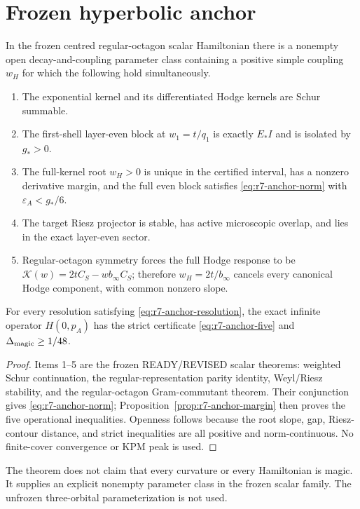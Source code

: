 \section{Frozen hyperbolic anchor}
\label{sec:r7-anchor}

\begin{theorem}
\label{thm:r7-anchor}
In the frozen centred regular-octagon scalar Hamiltonian there is a nonempty
open decay-and-coupling parameter class containing a positive simple coupling
$w_H$ for which the following hold simultaneously.
\begin{enumerate}
\item The exponential kernel and its differentiated Hodge kernels are Schur
summable.
\item The first-shell layer-even block at $w_1=t/q_1$ is exactly $E_*I$ and
is isolated by $g_*>0$.
\item The full-kernel root $w_H>0$ is unique in the certified interval, has a
nonzero derivative margin, and the full even block satisfies
\eqref{eq:r7-anchor-norm} with $\varepsilon_A<g_*/6$.
\item The target Riesz projector is stable, has active microscopic overlap,
and lies in the exact layer-even sector.
\item Regular-octagon symmetry forces the full Hodge response to be
$\mathcal K(w)=2tC_S-wb_\infty C_S$; therefore
$w_H=2t/b_\infty$ cancels every canonical Hodge component, with common
nonzero slope.
\end{enumerate}
For every resolution satisfying \eqref{eq:r7-anchor-resolution}, the exact
infinite operator $H(0,p_A)$ has the strict certificate
\eqref{eq:r7-anchor-five} and $\Delta_{\rm magic}\ge1/48$.
\end{theorem}

\begin{proof}
Items 1--5 are the frozen READY/REVISED scalar theorems: weighted Schur
continuation, the regular-representation parity identity, Weyl/Riesz
stability, and the regular-octagon Gram-commutant theorem.  Their conjunction
gives \eqref{eq:r7-anchor-norm}; Proposition~\ref{prop:r7-anchor-margin}
then proves the five operational inequalities.  Openness follows because
the root slope, gap, Riesz-contour distance, and strict inequalities are all
positive and norm-continuous.  No finite-cover convergence or KPM peak is
used.
\end{proof}

The theorem does not claim that every curvature or every Hamiltonian is
magic.  It supplies an explicit nonempty parameter class in the frozen scalar
family.  The unfrozen three-orbital parameterization is not used.
